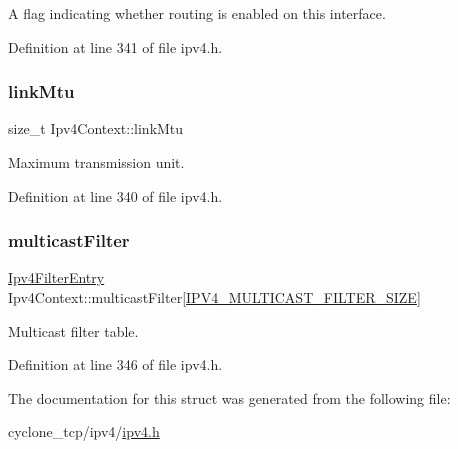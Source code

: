 A flag indicating whether routing is enabled on this interface. 



Definition at line 341 of file ipv4.\+h.

\mbox{\label{structIpv4Context_a62d0b87b8c952d8bcf8c989ed40f692c}} 
\subsubsection{\texorpdfstring{link\+Mtu}{linkMtu}}
{\footnotesize\ttfamily size\+\_\+t Ipv4\+Context\+::link\+Mtu}



Maximum transmission unit. 



Definition at line 340 of file ipv4.\+h.

\mbox{\label{structIpv4Context_a2f2ef3a66b5ad28d0080380b074a95ad}} 
\subsubsection{\texorpdfstring{multicast\+Filter}{multicastFilter}}
{\footnotesize\ttfamily \hyperlink{structIpv4FilterEntry}{Ipv4\+Filter\+Entry} Ipv4\+Context\+::multicast\+Filter\mbox{[}\hyperlink{net__config_8h_abad540441745129e90052cdfd1b27943}{I\+P\+V4\+\_\+\+M\+U\+L\+T\+I\+C\+A\+S\+T\+\_\+\+F\+I\+L\+T\+E\+R\+\_\+\+S\+I\+ZE}\mbox{]}}



Multicast filter table. 



Definition at line 346 of file ipv4.\+h.



The documentation for this struct was generated from the following file\+:\begin{DoxyCompactItemize}
\item 
cyclone\+\_\+tcp/ipv4/\hyperlink{ipv4_8h}{ipv4.\+h}\end{DoxyCompactItemize}
